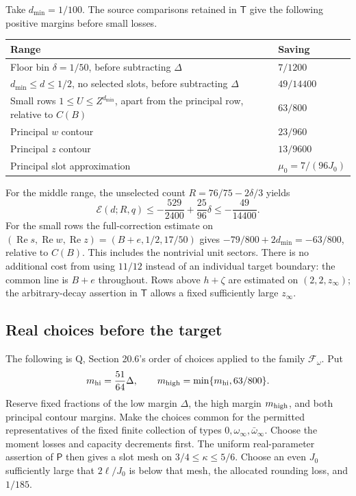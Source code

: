 \documentclass[11pt,a4paper]{article}
\theoremstyle{remark}\newtheorem{remark}[theorem]{Remark}
\newcommand{\Rea}{\operatorname{Re}}
\newcommand{\Packet}{\mathscr F_\omega}
\numberwithin{equation}{section}
\begin{document}
Take $d_{\min}=1/100$. The source comparisons retained in
$\mathsf T$ give the following positive margins before small
losses.
\begin{center}
\begin{tabular}{p{.57\linewidth}p{.31\linewidth}}
\toprule
Range & Saving\\
\midrule
Floor bin $\delta=1/50$, before subtracting $\Delta$
& $7/1200$\\
$d_{\min}\le d\le1/2$, no selected slots,
before subtracting $\Delta$ & $49/14400$\\
Small rows $1\le U\le Z^{d_{\min}}$,
apart from the principal row, relative to $C(B)$ & $63/800$\\
Principal $w$ contour & $23/960$\\
Principal $z$ contour & $13/9600$\\
Principal slot approximation & $\mu_0=7/(96J_0)$\\
\bottomrule
\end{tabular}
\end{center}
For the middle range, the unselected count
$R=76/75-2\delta/3$ yields
\[
 \mathcal E(d;R,q)\le
 -\frac{529}{2400}+\frac{25}{96}\delta
 \le-\frac{49}{14400}.
\]
For the small rows the full-correction estimate on
$(\Rea s,\Rea w,\Rea z)=(B+e,1/2,17/50)$ gives
$-79/800+2d_{\min}=-63/800$, relative to $C(B)$.
This includes the nontrivial unit sectors. There is no additional
cost from using $11/12$ instead of an individual target boundary:
the common line is $B+e$ throughout.
Rows above $h+\zeta$ are estimated on
$(2,2,z_\infty)$; the arbitrary-decay assertion in $\mathsf T$
allows a fixed sufficiently large $z_\infty$.

\subsection{Real choices before the target}

The following is Q, Section 20.6's order of choices applied to
the family $\Packet$. Put
\[
 m_{\rm hi}=\frac{51}{64}\Delta,\qquad
 m_{\rm high}=\min\{m_{\rm hi},63/800\}.
\]
Reserve fixed fractions of the low margin $\Delta$, the high
margin $m_{\rm high}$, and both principal contour margins.
Make the choices common for the permitted representatives of
the fixed finite collection of types $0,\omega_\infty,
\bar\omega_\infty$.
Choose the moment losses and capacity decrements first.
The uniform real-parameter assertion of $\mathsf P$ then
gives a slot mesh on $3/4\le\kappa\le5/6$.
Choose an even $J_0$ sufficiently large that
$2\ell/J_0$ is below that mesh, the allocated rounding loss,
and $1/185$.
\end{document}
